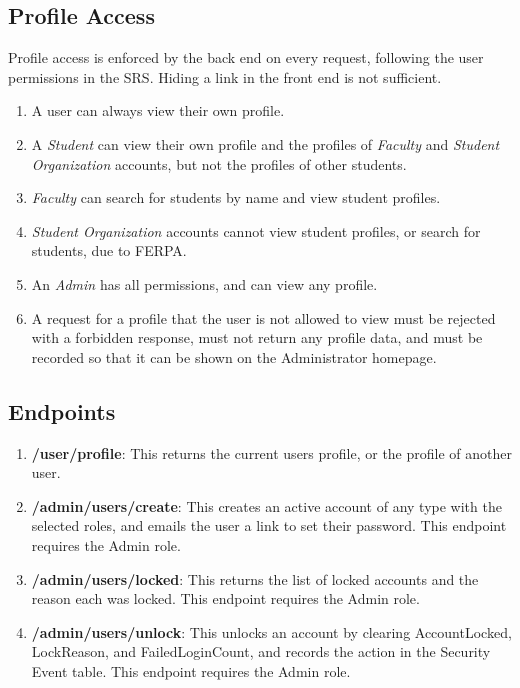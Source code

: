     \subsection{Profile Access}
        Profile access is enforced by the back end on every request, following the user permissions in the SRS. Hiding a link in the front end is not sufficient.

        \begin{enumerate}[leftmargin=3\parindent]
            \item A user can always view their own profile.
            \item A \emph{Student} can view their own profile and the profiles of \emph{Faculty} and \emph{Student Organization} accounts, but not the profiles of other students.
            \item \emph{Faculty} can search for students by name and view student profiles.
            \item \emph{Student Organization} accounts cannot view student profiles, or search for students, due to FERPA.
            \item An \emph{Admin} has all permissions, and can view any profile.
            \item A request for a profile that the user is not allowed to view must be rejected with a forbidden response, must not return any profile data, and must be recorded so that it can be shown on the Administrator homepage.
        \end{enumerate}

    \subsection{Endpoints}
        \begin{enumerate}[leftmargin=3\parindent]
            \item \textbf{/user/profile}: This returns the current users profile, or the profile of another user.
            \item \textbf{/admin/users/create}: This creates an active account of any type with the selected roles, and emails the user a link to set their password. This endpoint requires the Admin role.
            \item \textbf{/admin/users/locked}: This returns the list of locked accounts and the reason each was locked. This endpoint requires the Admin role.
            \item \textbf{/admin/users/unlock}: This unlocks an account by clearing AccountLocked, LockReason, and FailedLoginCount, and records the action in the Security Event table. This endpoint requires the Admin role.
        \end{enumerate}

